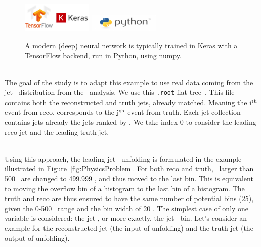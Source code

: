 \begin{figure}[h]
  \centering
  \includegraphics[width=0.30\textwidth]{../presentation/plots/TensorFlow_Keras.png}
  \includegraphics[width=0.30\textwidth]{../presentation/plots/Python.png}
  \caption{A modern (deep) neural network is typically trained in Keras with a TensorFlow backend, run in Python, using numpy.}
  \label{fig:CodeSoftware}
\end{figure}

\ \\The goal of the study is to adapt this example to use real data coming from the jet \pt~distribution from the \ttbaremu~analysis. We use this \texttt{.root} flat tree~\cite{RootFile}. This file contains both the reconstructed and truth jets, already matched. Meaning the i$^{\rm th}$ event from reco, corresponds to the j$^{\rm th}$ event from truth. Each jet collection contains jets already the jets ranked by \pt. We take index 0 to consider the leading reco jet and the leading truth jet.

\ \\Using this approach, the leading jet \pt~unfolding is formulated in the example illustrated in Figure~\ref{fig:PhysicsProblem}. For both reco and truth, \pt~larger than 500 \GeV~are changed to 499.999 \GeV, and thus moved to the last bin. This is equivalent to moving the overflow bin of a histogram to the last bin of a histogram. The truth and reco are thus ensured to have the same number of potential bins (25), given the 0-500 \GeV~range and the bin width of 20 \GeV. The simplest case of only one variable is considered: the jet \pt, or more exactly, the jet \pt~bin. Let's consider an example for the reconstructed jet (the input of unfolding) and the truth jet (the output of unfolding).

